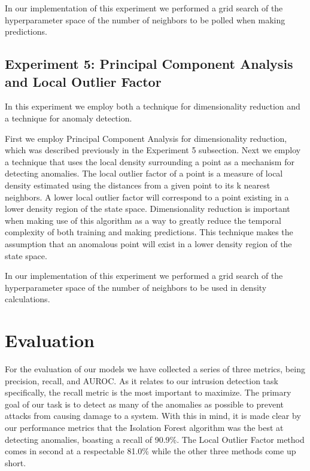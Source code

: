 \documentclass[conference]{IEEEtran}
\begin{document}
In our implementation of this experiment we performed a grid search of the hyperparameter space of the number of neighbors to be polled when making predictions.

\subsection*{Experiment 5: Principal Component Analysis and Local Outlier Factor}

In this experiment we employ both a technique for dimensionality reduction and a technique for anomaly detection.

First we employ Principal Component Analysis for dimensionality reduction, which was described previously in the Experiment 5 subsection. Next we employ a technique that uses the local density surrounding a point as a mechanism for detecting anomalies. The local outlier factor of a point is a measure of local density estimated using the distances from a given point to its k nearest neighbors. A lower local outlier factor will correspond to a point existing in a lower density region of the state space. Dimensionality reduction is important when making use of this algorithm as a way to greatly reduce the temporal complexity of both training and making predictions.  This technique makes the assumption that an anomalous point will exist in a lower density region of the state space.

In our implementation of this experiment we performed a grid search of the hyperparameter space of the number of neighbors to be used in density calculations.

\begin{comment}
\begin{figure}[htbp]
\centerline{\texttt{[image: results.png]}}
\caption{Performance metrics across all experiments.}
\label{fig}
\end{figure}
\end{comment}

\section{Evaluation}

For the evaluation of our models we have collected a series of three metrics, being precision, recall, and AUROC. As it relates to our intrusion detection task specifically, the recall metric is the most important to maximize. The primary goal of our task is to detect as many of the anomalies as possible to prevent attacks from causing damage to a system. With this in mind, it is made clear by our performance metrics that the Isolation Forest algorithm was the best at detecting anomalies, boasting a recall of 90.9\%. The Local Outlier Factor method comes in second at a respectable 81.0\% while the other three methods come up short.
\end{document}
